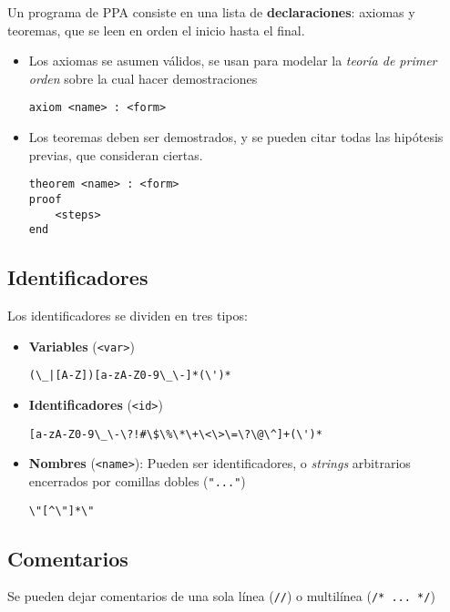 Un programa de PPA consiste en una lista de \textbf{declaraciones}: axiomas y
teoremas, que se leen en orden el inicio hasta el final.

\begin{itemize}
    \item Los axiomas se asumen válidos, se usan para modelar la \textit{teoría
    de primer orden} sobre la cual hacer demostraciones

    \begin{lstlisting}
axiom <name> : <form>
    \end{lstlisting}

    \item Los teoremas deben ser demostrados, y se pueden citar todas las
    hipótesis previas, que consideran ciertas.

    \begin{lstlisting}
theorem <name> : <form>
proof
    <steps>
end
    \end{lstlisting}
\end{itemize}

\subsection{Identificadores}

Los identificadores se dividen en tres tipos:

\begin{itemize}
    \item \textbf{Variables} (\texttt{<var>})
    
    \verb/(\_|[A-Z])[a-zA-Z0-9\_\-]*(\')*/

    \item \textbf{Identificadores} (\texttt{<id>})

    \verb/[a-zA-Z0-9\_\-\?!#\$\%\*\+\<\>\=\?\@\^]+(\')*/

    \item \textbf{Nombres} (\texttt{<name>}): Pueden ser identificadores, o
    \textit{strings} arbitrarios encerrados por comillas dobles (\texttt{"..."})

    \verb/\"[^\"]*\"/
\end{itemize}

\subsection{Comentarios}

Se pueden dejar comentarios de una sola línea (\texttt{//}) o multilínea
(\texttt{/* ... */})

